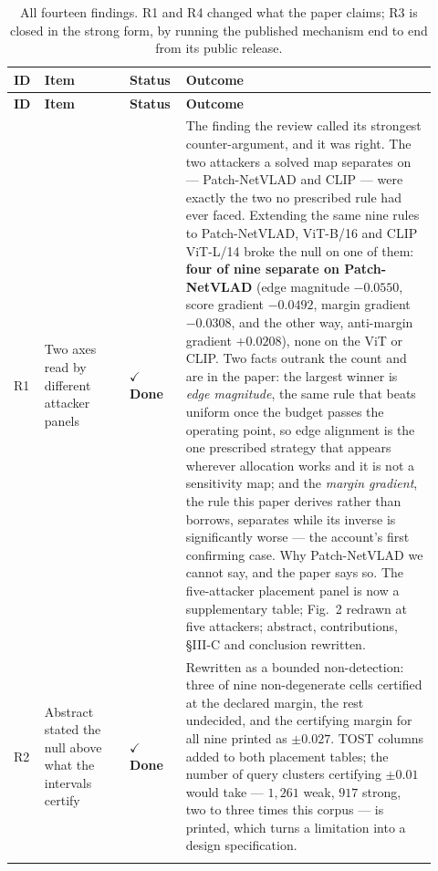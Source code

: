 \documentclass[11pt]{article}
\newcommand{\done}{\textcolor{DoneGreen}{\textbf{$\checkmark$ Done}}}
\begin{document}
\begin{longtable}{@{}p{0.05\linewidth}p{0.19\linewidth}p{0.11\linewidth}p{0.57\linewidth}@{}}
\caption{All fourteen findings. R1 and R4 changed what the paper claims; R3 is
closed in the strong form, by running the published mechanism end to end from
its public release.}
\label{tab:tifs14-open}\\
\toprule
\textbf{ID} & \textbf{Item} & \textbf{Status} & \textbf{Outcome} \\
\midrule
\endfirsthead
\toprule
\textbf{ID} & \textbf{Item} & \textbf{Status} & \textbf{Outcome} \\
\midrule
\endhead

R1 & Two axes read by different attacker panels & \done & The finding the
review called its strongest counter-argument, and it was right. The two
attackers a solved map separates on --- Patch-NetVLAD and CLIP --- were
exactly the two no prescribed rule had ever faced. Extending the same nine
rules to Patch-NetVLAD, ViT-B/16 and CLIP ViT-L/14 broke the null on one of
them: \textbf{four of nine separate on Patch-NetVLAD} (edge magnitude
$-0.0550$, score gradient $-0.0492$, margin gradient $-0.0308$, and the other
way, anti-margin gradient $+0.0208$), none on the ViT or CLIP. Two facts
outrank the count and are in the paper: the largest winner is \emph{edge
magnitude}, the same rule that beats uniform once the budget passes the
operating point, so edge alignment is the one prescribed strategy that appears
wherever allocation works and it is not a sensitivity map; and the
\emph{margin gradient}, the rule this paper derives rather than borrows,
separates while its inverse is significantly worse --- the account's first
confirming case. Why Patch-NetVLAD we cannot say, and the paper says so.
The five-attacker placement panel is now a supplementary table; Fig.~2 redrawn at five attackers; abstract, contributions,
\S III-C and conclusion rewritten. \\
\addlinespace

R2 & Abstract stated the null above what the intervals certify & \done &
Rewritten as a bounded non-detection: three of nine non-degenerate cells
certified at the declared margin, the rest undecided, and the certifying
margin for all nine printed as $\pm0.027$. TOST columns added to both
placement tables; the number of query clusters certifying $\pm0.01$ would take
--- $1{,}261$ weak, $917$ strong, two to three times this corpus --- is
printed, which turns a limitation into a design specification. \\
\addlinespace


\end{longtable}
\end{document}
